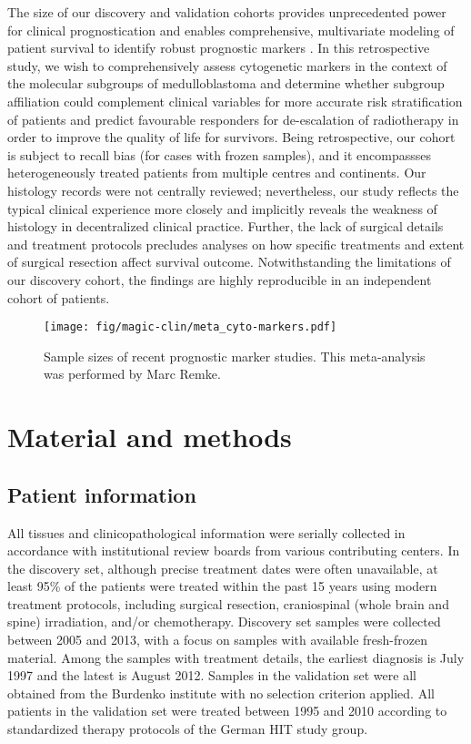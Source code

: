 The size of our discovery and validation cohorts provides unprecedented power for clinical prognostication and enables comprehensive, multivariate modeling of patient survival to identify robust prognostic markers . In this retrospective study, we wish to comprehensively assess cytogenetic markers in the context of the molecular subgroups of medulloblastoma and determine whether subgroup affiliation could complement clinical variables for more accurate risk stratification of patients and predict favourable responders for de-escalation of radiotherapy in order to improve the quality of life for survivors. Being retrospective, our cohort is subject to recall bias (for cases with frozen samples), and it encompassses heterogeneously treated patients from multiple centres and continents. Our histology records were not centrally reviewed; nevertheless, our study reflects the typical clinical experience more closely and implicitly reveals the weakness of histology in decentralized clinical practice. Further, the lack of surgical details and treatment protocols precludes analyses on how specific treatments and extent of surgical resection affect survival outcome. Notwithstanding the limitations of our discovery cohort, the findings are highly reproducible in an independent cohort of patients.

\begin{SCfigure}[5][t]
	\texttt{[image: fig/magic-clin/meta\_cyto-markers.pdf]}
	\caption[Sample sizes of recent prognostic marker studies]
	{
	Sample sizes of recent prognostic marker studies.
	This meta-analysis was performed by Marc Remke.
	}
	\label{fig:meta_cyto-markers}
\end{SCfigure}

\clearpage

\section{Material and methods}

\subsection{Patient information}

All tissues and clinicopathological information were serially collected in accordance with institutional review boards from various contributing centers. In the discovery set, although precise treatment dates were often unavailable, at least 95\% of the patients were treated within the past 15 years using modern treatment protocols, including surgical resection, craniospinal (whole brain and spine) irradiation, and/or chemotherapy. Discovery set samples were collected between 2005 and 2013, with a focus on samples with available fresh-frozen material. Among the samples with treatment details, the earliest diagnosis is July 1997 and the latest is August 2012. Samples in the validation set were all obtained from the Burdenko institute with no selection criterion applied. All patients in the validation set were treated between 1995 and 2010 according to standardized therapy protocols of the German HIT study group.

